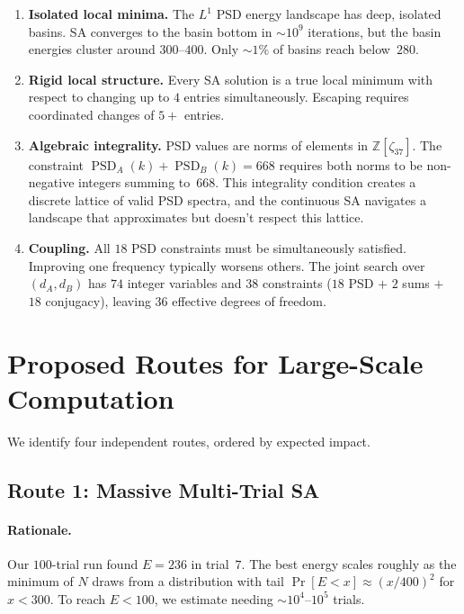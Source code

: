 \documentclass[11pt,a4paper]{article}
\newcommand{\Z}{\mathbb{Z}}
\newcommand{\PSD}{\operatorname{PSD}}
\theoremstyle{plain}
\theoremstyle{definition}
\theoremstyle{remark}
\begin{document}
\begin{enumerate}[label=(\roman*)]
\item \textbf{Isolated local minima.} The $L^1$ PSD energy landscape has deep, isolated basins. SA converges to the basin bottom in $\sim10^9$ iterations, but the basin energies cluster around $300$--$400$. Only $\sim1\%$ of basins reach below~$280$.

\item \textbf{Rigid local structure.} Every SA solution is a true local minimum with respect to changing up to $4$ entries simultaneously. Escaping requires coordinated changes of $5+$ entries.

\item \textbf{Algebraic integrality.} PSD values are norms of elements in $\Z[\zeta_{37}]$. The constraint $\PSD_A(k)+\PSD_B(k)=668$ requires both norms to be non-negative integers summing to~$668$. This integrality condition creates a discrete lattice of valid PSD spectra, and the continuous SA navigates a landscape that approximates but doesn't respect this lattice.

\item \textbf{Coupling.} All $18$ PSD constraints must be simultaneously satisfied. Improving one frequency typically worsens others. The joint search over $(d_A,d_B)$ has $74$ integer variables and $38$ constraints ($18$ PSD $+$ $2$ sums $+$ $18$ conjugacy), leaving $36$ effective degrees of freedom.
\end{enumerate}

\section{Proposed Routes for Large-Scale Computation}
\label{sec:routes}

We identify four independent routes, ordered by expected impact.

\subsection{Route 1: Massive Multi-Trial SA}
\label{sec:route1}

\paragraph{Rationale.} Our $100$-trial run found $E=236$ in trial~$7$. The best energy scales roughly as the minimum of $N$ draws from a distribution with tail $\Pr[E<x]\approx(x/400)^2$ for $x<300$. To reach $E<100$, we estimate needing $\sim10^4$--$10^5$ trials.
\end{document}
